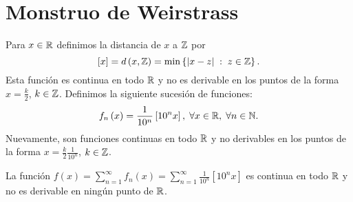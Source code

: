 \section{Monstruo de Weirstrass}
Para $\displaystyle x \in \mathbb{R} $ definimos la distancia de $\displaystyle x $ a $\displaystyle \mathbb{Z} $ por 
\[ \left[x\right] = d\left(x,\mathbb{Z}\right)= \min \left\{ \left|x-z\right| \; : \; z \in \mathbb{Z}\right\}  .\]
Esta función es continua en todo $\displaystyle \mathbb{R} $ y no es derivable en los puntos de la forma $\displaystyle x = \frac{k}{2} $, $\displaystyle k \in \mathbb{Z} $. Definimos la siguiente sucesión de funciones:
\[f_{n}\left(x\right) = \frac{1}{10^{n}}\left[10^{n}x\right], \; \forall x \in \mathbb{R}, \; \forall n \in \mathbb{N} .\]
Nuevamente, son funciones continuas en todo $\displaystyle \mathbb{R} $ y no derivables en los puntos de la forma $\displaystyle x = \frac{k}{2}\frac{1}{10^{n}} $, $\displaystyle k \in \mathbb{Z} $.
\begin{ftheorem}[]
\normalfont La función $\displaystyle f\left(x\right) = \sum^{\infty}_{n = 1}f_{n}\left(x\right) = \sum^{\infty}_{n = 1}\frac{1}{10^{n}}\left[10^{n}x\right] $ 
es continua en todo $\displaystyle \mathbb{R} $ y no es derivable en ningún punto de $\displaystyle \mathbb{R} $.
\end{ftheorem}
